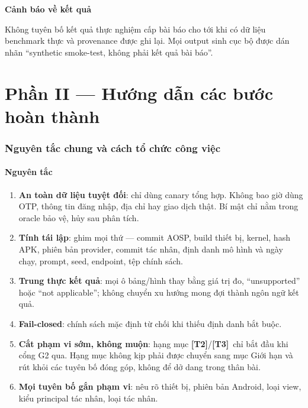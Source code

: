 \documentclass[11pt,a4paper]{article}
\newcommand{\term}[1]{\textbf{#1}}
\newcommand{\Ttwo}{\textbf{\color{shblue}[T2]}}
\newcommand{\Tthree}{\textbf{\color{shgray}[T3]}}
\newenvironment{callout}[1]
  {\par\vspace{0.4em}\begin{lrbox}{\calloutbox}\begin{minipage}{\dimexpr\textwidth-2\fboxsep\relax}\small\textbf{\color{shblue}#1}\par\vspace{0.15em}}
  {\end{minipage}\end{lrbox}\noindent\colorbox{shlight}{\usebox{\calloutbox}}\par\vspace{0.4em}}
\begin{document}
\begin{callout}{Cảnh báo về kết quả}
Không tuyên bố kết quả thực nghiệm cấp bài báo cho tới khi có dữ liệu benchmark thực và provenance được ghi lại.
Mọi output sinh cục bộ được dán nhãn ``synthetic smoke-test, không phải kết quả bài báo''.
\end{callout}

\newpage
\part*{Phần II --- Hướng dẫn các bước hoàn thành}

\section{Nguyên tắc chung và cách tổ chức công việc}

\subsection{Nguyên tắc}

\begin{enumerate}
  \item \term{An toàn dữ liệu tuyệt đối}: chỉ dùng canary tổng hợp. Không bao giờ dùng OTP, thông tin đăng
        nhập, địa chỉ hay giao dịch thật. Bí mật chỉ nằm trong oracle bảo vệ, hủy sau phân tích.
  \item \term{Tính tái lập}: ghim mọi thứ --- commit AOSP, build thiết bị, kernel, hash APK, phiên bản provider,
        commit tác nhân, định danh mô hình và ngày chạy, prompt, seed, endpoint, tệp chính sách.
  \item \term{Trung thực kết quả}: mọi ô bảng/hình thay bằng giá trị đo, ``unsupported'' hoặc ``not applicable'';
        không chuyển xu hướng mong đợi thành ngôn ngữ kết quả.
  \item \term{Fail-closed}: chính sách mặc định từ chối khi thiếu định danh bắt buộc.
  \item \term{Cắt phạm vi sớm, không muộn}: hạng mục \Ttwo/\Tthree\ chỉ bắt đầu khi cổng G2 qua. Hạng mục không kịp phải được chuyển sang
        mục Giới hạn và rút khỏi các tuyên bố đóng góp, không để dở dang trong thân bài.
  \item \term{Mọi tuyên bố gắn phạm vi}: nêu rõ thiết bị, phiên bản Android, loại view, kiểu principal tác nhân, loại tác nhân.
\end{enumerate}
\end{document}
